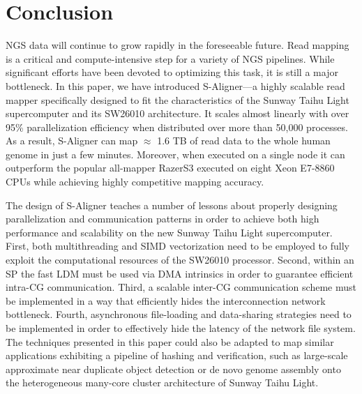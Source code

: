 \documentclass[conference]{IEEEtran}
\begin{document}
\section{Conclusion}
\label{Conclusion}

NGS data will continue to grow rapidly in the foreseeable future. Read mapping is a critical and compute-intensive step for a variety of NGS pipelines. While significant efforts have been devoted to optimizing this task, it is still a major bottleneck. In this paper, we have introduced S-Aligner---a highly scalable read mapper specifically designed to fit the characteristics of the Sunway Taihu Light supercomputer and its SW26010 architecture.
It scales almost linearly with over 95\% parallelization efficiency when distributed over more than 50,000 processes. As a result, S-Aligner can map $\approx$ 1.6 TB of read data to the whole human genome in just a few minutes. Moreover, when executed on a single node it can outperform the popular all-mapper RazerS3 executed on eight Xeon E7-8860 CPUs while achieving highly competitive mapping accuracy.

The design of S-Aligner teaches a number of lessons about properly designing parallelization and communication patterns in order to achieve both high performance and scalability on the new Sunway Taihu Light supercomputer. First, both multithreading and SIMD vectorization need to be employed to fully exploit the computational resources of the SW26010 processor. Second, within an SP the fast LDM must be used via DMA intrinsics in order to guarantee efficient intra-CG communication. Third, a scalable inter-CG communication scheme must be implemented in a way that efficiently hides the interconnection network bottleneck. Fourth, asynchronous file-loading and data-sharing strategies need to be implemented in order to effectively hide the latency of the network file system. The techniques presented in this paper could also be adapted to map similar applications exhibiting a pipeline of hashing and verification, such as large-scale approximate near duplicate object detection \cite{efficient} or de novo genome assembly \cite{swap} onto the heterogeneous many-core cluster architecture of Sunway Taihu Light. 







\end{document}
